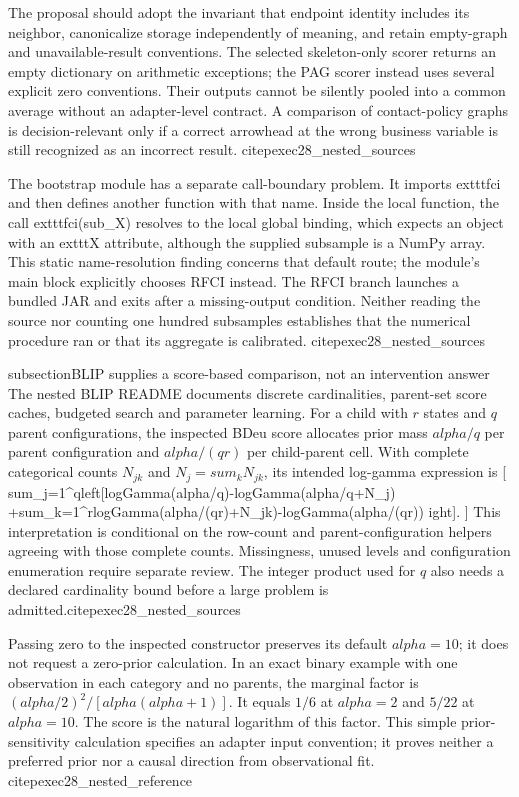 The proposal should adopt the invariant that endpoint identity includes its
neighbor, canonicalize storage independently of meaning, and retain empty-graph
and unavailable-result conventions. The selected skeleton-only scorer returns
an empty dictionary on arithmetic exceptions; the PAG scorer instead uses
several explicit zero conventions. Their outputs cannot be silently pooled
into a common average without an adapter-level contract. A comparison of
contact-policy graphs is decision-relevant only if a correct arrowhead at the
wrong business variable is still recognized as an incorrect result.
citep{exec28_nested_sources}

The bootstrap module has a separate call-boundary problem. It imports
	exttt{fci} and then defines another function with that name. Inside the local
function, the call 	exttt{fci(sub_X)} resolves to the local global binding,
which expects an object with an 	exttt{X} attribute, although the supplied
subsample is a NumPy array. This static name-resolution finding concerns that
default route; the module's main block explicitly chooses RFCI instead. The
RFCI branch launches a bundled JAR and exits after a missing-output condition.
Neither reading the source nor counting one hundred subsamples establishes
that the numerical procedure ran or that its aggregate is calibrated.
citep{exec28_nested_sources}

subsection{BLIP supplies a score-based comparison, not an intervention answer}
The nested BLIP README documents discrete cardinalities, parent-set score
caches, budgeted search and parameter learning. For a child with $r$ states
and $q$ parent configurations, the inspected BDeu score allocates prior mass
$alpha/q$ per parent configuration and $alpha/(qr)$ per child-parent cell.
With complete categorical counts $N_{jk}$ and $N_j=sum_kN_{jk}$, its intended
log-gamma expression is
[
 sum_{j=1}^{q}left[logGamma(alpha/q)-logGamma(alpha/q+N_j)
 +sum_{k=1}^{r}{logGamma(alpha/(qr)+N_{jk})-logGamma(alpha/(qr))}
ight].
]
This interpretation is conditional on the row-count and parent-configuration
helpers agreeing with those complete counts. Missingness, unused levels and
configuration enumeration require separate review. The integer product used
for $q$ also needs a declared cardinality bound before a large problem is
admitted.citep{exec28_nested_sources}

Passing zero to the inspected constructor preserves its default $alpha=10$;
it does not request a zero-prior calculation. In an exact binary example with
one observation in each category and no parents, the marginal factor is
$(alpha/2)^2/[alpha(alpha+1)]$. It equals $1/6$ at $alpha=2$ and $5/22$
at $alpha=10$. The score is the natural logarithm of this factor. This simple
prior-sensitivity calculation specifies an adapter input convention; it proves
neither a preferred prior nor a causal direction from observational fit.
citep{exec28_nested_reference}

